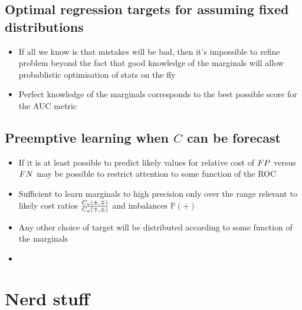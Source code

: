 \documentclass{article}
\begin{document}
\subsection{Optimal regression targets for assuming fixed distributions}
  \begin{itemize}
  \item
    If all we know is that mistakes will be bad, then it's impossible to refine problem beyond the fact that good knowledge of the marginals will allow probablistic optimisation of stats on the fly
  \item
    Perfect knowledge of the marginals corresponds to the best possible score for the AUC metric
      \end{itemize}
  
  
    \subsection{Preemptive learning when $C$ can be forecast}
  \begin{itemize}
  \item
    If it is at least possible to predict likely values for relative cost of $\FP$ versus $\FN$ may be possible to restrict attention to some function of the ROC
  \item
    Sufficient to learn marginals to high precision only over the range relevant to likely cost ratios $\frac{\SCORE_\Usr(\pm,\mp)}{\SCORE_\Usr(\mp,\pm)}$ and imbalances $\mathbb P(+)$
  \item
    Any other choice of target will be distributed according to some function of the marginals
  \item
          \end{itemize}
          \section{Nerd stuff}
\end{document}
